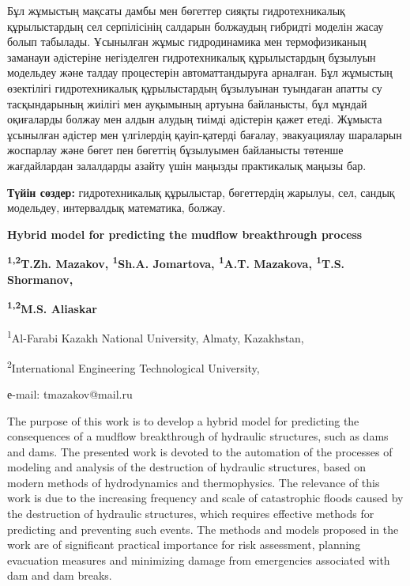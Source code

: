 Бұл жұмыстың мақсаты дамбы мен бөгеттер сияқты гидротехникалық
құрылыстардың сел серпілісінің салдарын болжаудың гибридті моделін жасау
болып табылады. Ұсынылған жұмыс гидродинамика мен термофизиканың
заманауи әдістеріне негізделген гидротехникалық құрылыстардың бұзылуын
модельдеу және талдау процестерін автоматтандыруға арналған. Бұл
жұмыстың өзектілігі гидротехникалық құрылыстардың бұзылуынан туындаған
апатты су тасқындарының жиілігі мен ауқымының артуына байланысты, бұл
мұндай оқиғаларды болжау мен алдын алудың тиімді әдістерін қажет етеді.
Жұмыста ұсынылған әдістер мен үлгілердің қауіп-қатерді бағалау,
эвакуациялау шараларын жоспарлау және бөгет пен бөгеттің бұзылуымен
байланысты төтенше жағдайлардан залалдарды азайту үшін маңызды
практикалық маңызы бар.

{\bfseries Түйін сөздер:} гидротехникалық құрылыстар, бөгеттердің жарылуы,
сел, сандық модельдеу, интервалдық математика, болжау.

\begin{center}
{\large\bfseries Hybrid model for predicting the mudflow breakthrough process}

{\bfseries \textsuperscript{1,2}T.Zh. Mazakov\envelope, \textsuperscript{1}Sh.A.
Jomartova, \textsuperscript{1}A.T. Mazakova, \textsuperscript{1}T.S.
Shormanov,}

{\bfseries \textsuperscript{1,2}M.S. Aliaskar}

\textsuperscript{1}Al-Farabi Kazakh National University, Almaty,
Kazakhstan,

\textsuperscript{2}International Engineering Technological University,

е-mail: tmazakov@mail.ru
\end{center}

The purpose of this work is to develop a hybrid model for predicting the
consequences of a mudflow breakthrough of hydraulic structures, such as
dams and dams. The presented work is devoted to the automation of the
processes of modeling and analysis of the destruction of hydraulic
structures, based on modern methods of hydrodynamics and thermophysics.
The relevance of this work is due to the increasing frequency and scale
of catastrophic floods caused by the destruction of hydraulic
structures, which requires effective methods for predicting and
preventing such events. The methods and models proposed in the work are
of significant practical importance for risk assessment, planning
evacuation measures and minimizing damage from emergencies associated
with dam and dam breaks.

